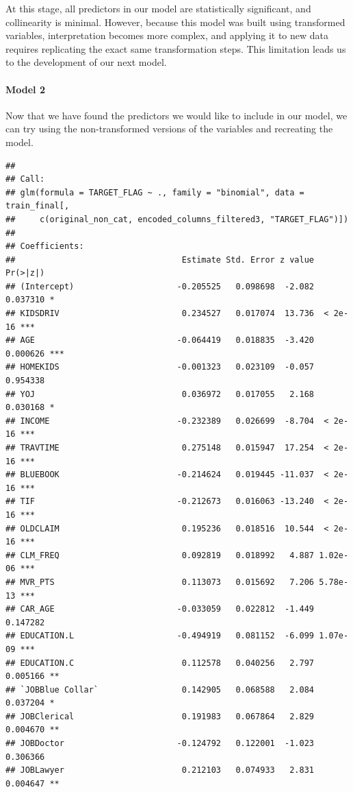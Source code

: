 \documentclass[
]{article}
\begin{document}
At this stage, all predictors in our model are statistically
significant, and collinearity is minimal. However, because this model
was built using transformed variables, interpretation becomes more
complex, and applying it to new data requires replicating the exact same
transformation steps. This limitation leads us to the development of our
next model.

\paragraph{Model 2}\label{model-2}

Now that we have found the predictors we would like to include in our
model, we can try using the non-transformed versions of the variables
and recreating the model.

\begin{verbatim}
## 
## Call:
## glm(formula = TARGET_FLAG ~ ., family = "binomial", data = train_final[, 
##     c(original_non_cat, encoded_columns_filtered3, "TARGET_FLAG")])
## 
## Coefficients:
##                                  Estimate Std. Error z value Pr(>|z|)    
## (Intercept)                     -0.205525   0.098698  -2.082 0.037310 *  
## KIDSDRIV                         0.234527   0.017074  13.736  < 2e-16 ***
## AGE                             -0.064419   0.018835  -3.420 0.000626 ***
## HOMEKIDS                        -0.001323   0.023109  -0.057 0.954338    
## YOJ                              0.036972   0.017055   2.168 0.030168 *  
## INCOME                          -0.232389   0.026699  -8.704  < 2e-16 ***
## TRAVTIME                         0.275148   0.015947  17.254  < 2e-16 ***
## BLUEBOOK                        -0.214624   0.019445 -11.037  < 2e-16 ***
## TIF                             -0.212673   0.016063 -13.240  < 2e-16 ***
## OLDCLAIM                         0.195236   0.018516  10.544  < 2e-16 ***
## CLM_FREQ                         0.092819   0.018992   4.887 1.02e-06 ***
## MVR_PTS                          0.113073   0.015692   7.206 5.78e-13 ***
## CAR_AGE                         -0.033059   0.022812  -1.449 0.147282    
## EDUCATION.L                     -0.494919   0.081152  -6.099 1.07e-09 ***
## EDUCATION.C                      0.112578   0.040256   2.797 0.005166 ** 
## `JOBBlue Collar`                 0.142905   0.068588   2.084 0.037204 *  
## JOBClerical                      0.191983   0.067864   2.829 0.004670 ** 
## JOBDoctor                       -0.124792   0.122001  -1.023 0.306366    
## JOBLawyer                        0.212103   0.074933   2.831 0.004647 ** 

\end{verbatim}
\end{document}
